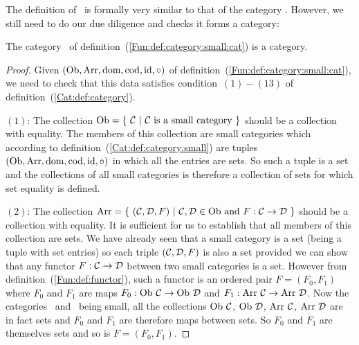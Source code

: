 The definition of \cat\ is formally very similar to that of the category \Set.
However, we still need to do our due diligence and checks it forms a category:

\begin{prop}\label{Fun:prop:category:small:cat}
    The category \cat\ of definition~(\ref{Fun:def:category:small:cat}) is 
    a category.
\end{prop}
\begin{proof}
    Given $(\mbox{\rm Ob}, \mbox{\rm Arr}, \mbox{\rm dom}, \mbox{\rm cod}, \mbox{\rm id}, \circ)$ of
    definition~(\ref{Fun:def:category:small:cat}), we need to check that this
    data satisfies condition~$(1)-(13)$ of definition~(\ref{Cat:def:category}).

    $(1)$: The collection $\ob=\{\ \Cat\ |\ \mbox{\Cat\ is a small category}\ \}$
    should be a collection with equality. The members of this collection are 
    small categories which according to definition~(\ref{Cat:def:category:small})
    are tuples $(\mbox{\rm Ob}, \mbox{\rm Arr}, \mbox{\rm dom}, \mbox{\rm cod}, \mbox{\rm id}, \circ)$ in which all the entries
    are sets. So such a tuple is a set and the collections of all small 
    categories is therefore a collection of sets for which set equality is 
    defined.

    $(2)$: The collection $\arr =\{\ (\Cat,\Dat,F)\ |\ \Cat,\Dat\in\ob\  
    \mbox{and}\ F:\Cat\to\Dat\ \}$ should be a collection with equality.
    It is sufficient for us to establish that all members of this collection
    are sets. We have already seen that a small category is a set
    (being a tuple with set entries) so each triple $(\mbox{$\cal C$},\mbox{$\cal D$},F)$ is also
    a set provided we can show that any functor $F:\mbox{$\cal C$}\to\mbox{$\cal D$}$ between two
    small categories is a set. However from definition~(\ref{Fun:def:functor}),
    such a functor is an ordered pair $F=(F_{0},F_{1})$ where $F_{0}$ and 
    $F_{1}$ are maps $F_{0}:\mbox{\rm Ob}\ \mbox{$\cal C$}\to\mbox{\rm Ob}\ \mbox{$\cal D$}$ and 
    $F_{1}:\mbox{\rm Arr}\ \mbox{$\cal C$}\to\mbox{\rm Arr}\ \mbox{$\cal D$}$. Now the categories \Cat\ and \Dat\ being
    small, all the collections $\mbox{\rm Ob}\ \mbox{$\cal C$}$, $\ob\ \Dat$, $\mbox{\rm Arr}\ \mbox{$\cal C$}$, 
    $\mbox{\rm Arr}\ \mbox{$\cal D$}$ are in fact sets and $F_{0}$ and $F_{1}$ are therefore maps
    between sets. So $F_{0}$ and $F_{1}$ are themselves sets and so is 
    $F=(F_{0},F_{1})$.
\end{proof}
